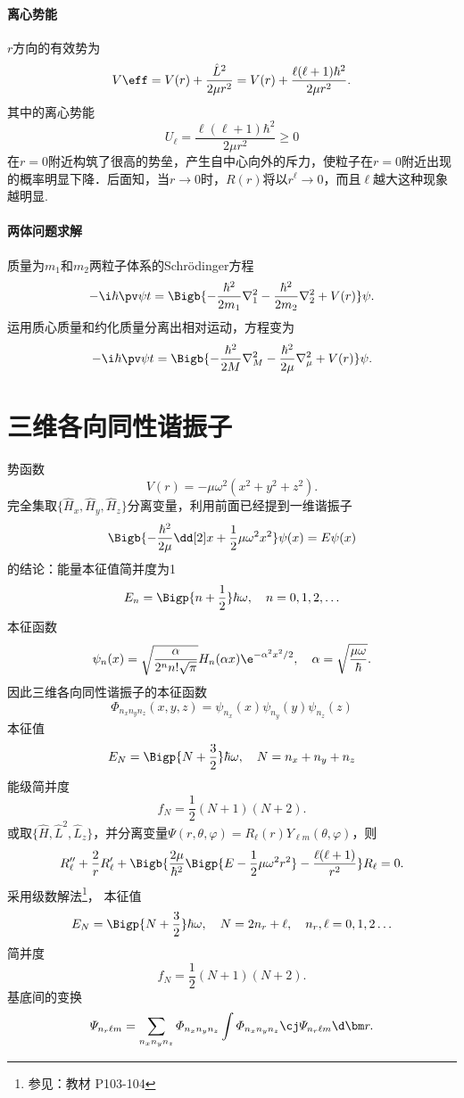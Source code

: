 \paragraph{离心势能}
$r$方向的有效势为
\[
V\eff=V(r)+\frac{\hat L^2}{2\mu r^2}=V(r)+\frac{\ell(\ell+1)\hbar^2}{2\mu r^2}.
\]
其中的离心势能
\[
U_\ell=\frac{\ell(\ell+1)\hbar^2}{2\mu r^2}\geqslant 0
\] %
在$r=0$附近构筑了很高的势垒，产生自中心向外的斥力，使粒子在$r=0$附近出现的概率明显下降．后面知，当$r\to0$时，$R(r)$将以$r^\ell\to0$，而且$\ell$越大这种现象越明显.

\paragraph{两体问题求解}质量为$m_1$和$m_2$两粒子体系的Schrödinger方程
\[
	-\i\hbar\pv\psi{t}=\Bigb{-\frac{\hbar^2}{2m_1}\nabla_1^2-\frac{\hbar^2}{2m_2}\nabla_2^2+V(r)}\psi.
\]
运用质心质量和约化质量分离出相对运动，\Schr 方程变为
\[
	-\i\hbar\pv\psi{t}=\Bigb{-\frac{\hbar^2}{2M}\nabla_M^2-\frac{\hbar^2}{2\mu}\nabla_\mu^2+V(r)}\psi.
\]
\section{三维各向同性谐振子}
势函数
\[
	V(r)=-\mu\omega^2(x^2 +y^2 +z^2).
\]
完全集取$\{\hat H_x,\hat H_y,\hat H_z\}$分离变量，利用前面已经提到一维谐振子
\[
	\Bigb{-\frac{\hbar^2}{2\mu}\dd[2]x+\frac12\mu \omega^2x^2}\psi(x)=E\psi(x)
\]
的结论：能量本征值简并度为1
\[
	E_{n}=\Bigp{n+\frac12}\hbar \omega, \quad n=0,1,2, \ldots
\]
本征函数
\[
	\psi_n(x)=\sqrt{\frac{\alpha}{2^nn!\sqrt\pi}}H_n(\alpha x)\e^{-\alpha^2x^2/2},\quad\alpha=\sqrt{\frac{\mu\omega}\hbar}.
\]
因此三维各向同性谐振子的本征函数
\[
	\varPhi_{n_xn_yn_z}(x,y,z)=\psi_{n_x}(x)\psi_{n_y}(y)\psi_{n_z}(z)
\]
本征值
\[
	E_N=\Bigp{N+\frac32}\hbar\omega,\quad N=n_x+n_y+n_z
\]
能级简并度
\[
	f_N=\frac12(N+1)(N+2).
\]
或取$\{\hat H,\hat L^2,\hat L_z\}$，并分离变量$\varPsi(r,\theta,\varphi)=R_\ell(r)Y_{\ell m}(\theta,\varphi)$，则
\[
	R_\ell''+\frac2rR_\ell'+\Bigb{\frac{2\mu}{\hbar^2}\Bigp{E-\frac12\mu\omega^2r^2}-\frac{\ell(\ell+1)}{r^2}}R_\ell=0.
\]
采用级数解法\footnote{参见：教材 P103-104}，
本征值
\[
	E_N=\Bigp{N+\frac32}\hbar\omega,\quad N=2n_r+\ell,\quad n_r,\ell=0,1,2\ldots
\]
简并度
\[
	f_N=\frac12(N+1)(N+2).
\]
基底间的变换
\[
	\varPsi_{n_r\ell m}=\sum_{n_xn_yn_z}\varPhi_{n_xn_yn_z}\int\varPhi_{n_xn_yn_z}\cj\varPsi_{n_r\ell m}\d\bm r.
\]
